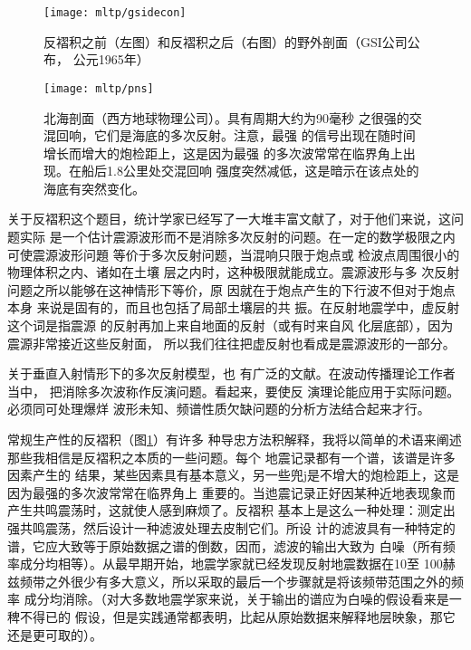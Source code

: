 \begin{figure}[H]
\centering
\texttt{[image: mltp/gsidecon]}
\caption[gsidecon]{
反褶积之前（左图）和反褶积之后（右图）的野外剖面（GSI公司公布，
公元1965年）
}
\label{fig:mltp/gsidecon}
\end{figure}

\begin{figure}[H]
\centering
\texttt{[image: mltp/pns]}
\caption[pns]{
北海剖面（西方地球物理公司）。具有周期大约为90毫秒
之很强的交混回响，它们是海底的多次反射。注意，最强
的信号出现在随时间增长而增大的炮检距上，这是因为最强
的多次波常常在临界角上出现。在船后1.8公里处交混回响
强度突然减低，这是暗示在该点处的海底有突然变化。
}
\label{fig:mltp/pns}
\end{figure}

关于反褶积这个题目，统计学家已经写了一大堆丰富文献了，对于他们来说，这问题实际
是一个估计震源波形而不是消除多次反射的问题。在一定的数学极限之内可使震源波形问題
等价于多次反射问题，当混响只限于炮点或
检波点周围很小的物理体积之内、诸如在土壤
层之内时，这种极限就能成立。震源波形与多
次反射问题之所以能够在这神情形下等价，原
因就在于炮点产生的下行波不但对于炮点本身
来说是固有的，而且也包括了局部土壤层的共
振。在反射地震学中，虚反射这个词是指震源
的反射再加上来自地面的反射（或有时来自风
化层底部），因为震源非常接近这些反射面，
所以我们往往把虚反射也看成是震源波形的一部分。

关于垂直入射情形下的多次反射模型，也
有广泛的文献。在波动传播理论工作者当中，
把消除多次波称作反演问题。看起来，要使反
演理论能应用于实际问题。必须同可处理爆烊
波形未知、频谱性质欠缺问题的分析方法结合起来才行。

常规生产性的反褶积（图\ref{fig:mltp/gsidecon}）有许多
种导忠方法积解释，我将以简单的术语来阐述
那些我相信是反褶积之本质的一些问题。每个
地震记录都有一个谱，该谱是许多因素产生的
结果，某些因素具有基本意义，另一些兜j是不增大的炮检距上，这是因为最强的多次波常常在临界角上
重要的。当迆震记录正好因某种近地表现象而
产生共鸣震荡时，这就使人感到麻烦了。反褶积
基本上是这么一种处理：测定出强共鸣震荡，然后设计一种滤波处理去皮制它们。所设
计的滤波具有一种特定的谱，它应大致等于原始数据之谱的倒数，因而，滤波的输出大致为
白噪（所有频率成分均相等）。从最早期开始，地震学家就已经发现反射地震数据在10至
100赫兹频带之外很少有多大意义，所以采取的最后一个步骤就是将该频带范围之外的频率
成分均消除。（对大多数地震学家来说，关于输出的谱应为白噪的假设看来是一稗不得已的
假设，但是实践通常都表明，比起从原始数据来解释地层映象，那它还是更可取的）。


